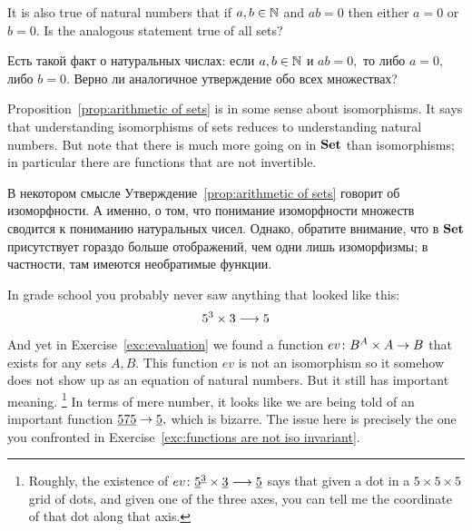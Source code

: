\documentclass[CT4S-EN-RU]{subfiles}
\begin{document}
\begin{exerciseENG}
It is also true of natural numbers that if $a,b\in{\mathbb N}$ and $ab=0$ then either $a=0$ or $b=0.$ Is the analogous statement true of all sets?
\end{exerciseENG}

\begin{exerciseRUS}
Есть такой факт о натуральных числах: если $a,b\in{\mathbb N}$ и $ab=0,$ то либо $a=0,$ либо $b=0.$ Верно ли аналогичное утверждение обо всех множествах?
\end{exerciseRUS}

\begin{blockENG}
Proposition~\ref{prop:arithmetic of sets} is in some sense about isomorphisms. It says that understanding isomorphisms of sets reduces to understanding natural numbers. But note that there is much more going on in ${\mathbf{Set}}$ than isomorphisms; in particular there are functions that are not invertible.
\end{blockENG}

\begin{blockRUS}
В некотором смысле Утверждение~\ref{prop:arithmetic of sets} говорит об изоморфности. А именно, о том, что понимание изоморфности множеств сводится к пониманию натуральных чисел. Однако, обратите внимание, что в ${\mathbf{Set}}$ присутствует гораздо больше отображений, чем одни лишь изоморфизмы; в частности, там имеются необратимые функции.
\end{blockRUS}

\begin{blockENG}
In grade school you probably never saw anything that looked like this:
$$5^3\times 3\longrightarrow 5$$
And yet in Exercise~\ref{exc:evaluation} we found a function $ev\colon B^A\times A\rightarrow B$ that exists for any sets $A,B.$ This function $ev$ is not an isomorphism so it somehow does not show up as an equation of natural numbers. But it still has important meaning.%
\footnote{Roughly, the existence of $ev\colon\underline{5}^{\underline{3}}\times\underline{3}\longrightarrow \underline{5}$ says that given a dot in a $5\times 5\times 5$ grid of dots, and given one of the three axes, you can tell me the coordinate of that dot along that axis.} In terms of mere number, it looks like we are being told of an important function $\underline{575}\rightarrow\underline{5},$ which is bizarre. The issue here is precisely the one you confronted in Exercise~\ref{exc:functions are not iso invariant}.
\end{blockENG}
\end{document}
